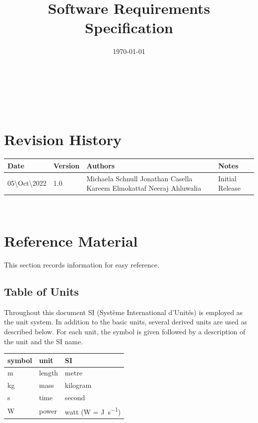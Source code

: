 \documentclass[12pt]{article}
\begin{document}
\title{Software Requirements Specification\\
\progname} 
\author{\authname}
\date{\today}
	
\maketitle

~\newpage


\tableofcontents

~\newpage

\section*{Revision History}

\begin{tabularx}{\textwidth}{p{3cm}p{2cm}p{4cm}X}
\toprule {\bf Date} & {\bf Version} & {\bf Authors} & {\bf Notes}\\
\midrule
05\textbackslash Oct\textbackslash 2022 & 1.0 & Michaela Schnull \newline Jonathan Casella \newline Kareem Elmokattaf \newline Neeraj Ahluwalia & Initial Release\\
\bottomrule
\end{tabularx}

~\newpage

\section{Reference Material}

This section records information for easy reference.

\subsection{Table of Units}

Throughout this document SI (Syst\`{e}me International d'Unit\'{e}s) is employed
as the unit system.  In addition to the basic units, several derived units are
used as described below.  For each unit, the symbol is given followed by a
description of the unit and the SI name.
~\newline

\renewcommand{\arraystretch}{1.2}
  \noindent \begin{tabular}{l l l} 
    \toprule		
    \textbf{symbol} & \textbf{unit} & \textbf{SI}\\
    \midrule 
    \si{\metre} & length & metre\\
    \si{\kilogram} & mass	& kilogram\\
    \si{\second} & time & second\\
    \si{\watt} & power & watt (W = \si{\joule\per\second})\\
    \bottomrule
  \end{tabular}
\end{document}
